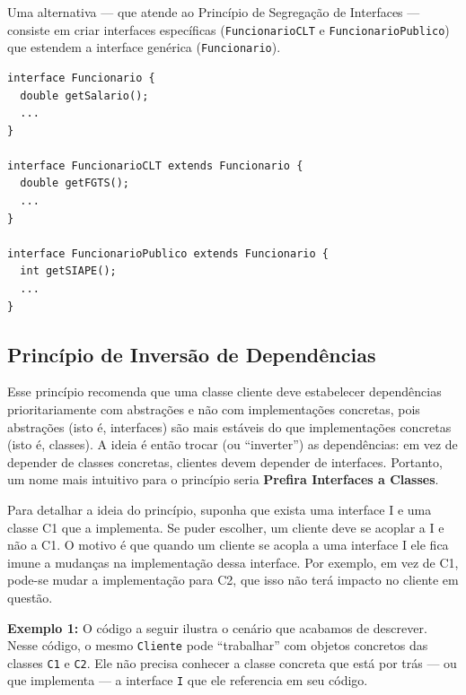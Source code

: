 \documentclass[
  11pt,
  twoside]{book}
\newcommand{\passthrough}[1]{#1}
\begin{document}
Uma alternativa --- que atende ao Princípio de Segregação de Interfaces
--- consiste em criar interfaces específicas
(\passthrough{\lstinline!FuncionarioCLT!} e
\passthrough{\lstinline!FuncionarioPublico!}) que estendem a interface
genérica (\passthrough{\lstinline!Funcionario!}).

\begin{lstlisting}
interface Funcionario {
  double getSalario();
  ...
}

interface FuncionarioCLT extends Funcionario {
  double getFGTS();
  ...
}

interface FuncionarioPublico extends Funcionario {
  int getSIAPE();
  ...
}
\end{lstlisting}

\hypertarget{princuxedpio-de-inversuxe3o-de-dependuxeancias}{%
\subsection{Princípio de Inversão de
Dependências}\label{princuxedpio-de-inversuxe3o-de-dependuxeancias}}

 

Esse princípio recomenda que uma classe cliente deve estabelecer
dependências prioritariamente com abstrações e não com implementações
concretas, pois abstrações (isto é, interfaces) são mais estáveis do que
implementações concretas (isto é, classes). A ideia é então trocar (ou
``inverter'') as dependências: em vez de depender de classes concretas,
clientes devem depender de interfaces. Portanto, um nome mais intuitivo
para o princípio seria \textbf{Prefira Interfaces a Classes}.

Para detalhar a ideia do princípio, suponha que exista uma interface I e
uma classe C1 que a implementa. Se puder escolher, um cliente deve se
acoplar a I e não a C1. O motivo é que quando um cliente se acopla a uma
interface I ele fica imune a mudanças na implementação dessa interface.
Por exemplo, em vez de C1, pode-se mudar a implementação para C2, que
isso não terá impacto no cliente em questão.

\textbf{Exemplo 1:} O código a seguir ilustra o cenário que acabamos de
descrever. Nesse código, o mesmo \passthrough{\lstinline!Cliente!} pode
``trabalhar'' com objetos concretos das classes
\passthrough{\lstinline!C1!} e \passthrough{\lstinline!C2!}. Ele não
precisa conhecer a classe concreta que está por trás --- ou que
implementa --- a interface \passthrough{\lstinline!I!} que ele
referencia em seu código.
\end{document}
